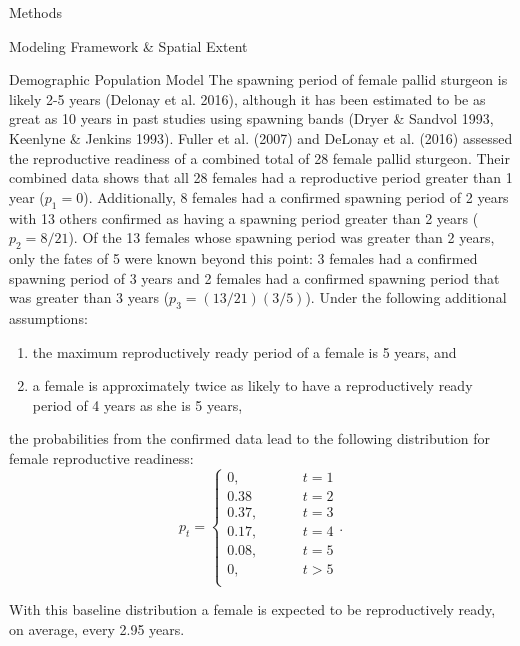 \documentclass[12pt]{article}
\begin{document}
\begin{section}{Methods}
\begin{subsection}{Modeling Framework \& Spatial Extent}
\begin{subsubsection}{Demographic Population Model}
The spawning period of female pallid sturgeon is likely 2-5 years (Delonay et al. 2016), although it has been estimated to be as great as 10 years in past studies using spawning bands (Dryer \& Sandvol 1993, Keenlyne \& Jenkins 1993).  Fuller et al. (2007) and DeLonay et al. (2016) assessed the reproductive readiness of a combined total of  28 female pallid sturgeon.  Their combined data shows that all 28 females had a reproductive period greater than 1 year ($p_1=0$).  Additionally, 8 females had a confirmed spawning period of 2 years with 13 others confirmed as having a spawning period greater than 2 years ($p_2=8/21$).  Of the 13 females whose spawning period was greater than 2 years, only the fates of 5 were known beyond this point: 3 females had a confirmed spawning period of 3 years and 2 females had a confirmed spawning period that was greater than 3 years ($p_3=(13/21)(3/5)$).  Under the following additional assumptions:
\begin{enumerate}
\item the maximum reproductively ready period of a female is 5 years, and
\item a female is approximately twice as likely to have a reproductively ready period of 4 years as she is 5 years,
\end{enumerate}
the probabilities from the confirmed data lead to the following distribution for female reproductive readiness:  
\begin{equation}
p_t = \begin{cases}
0, & \hspace{1cm} t=1\\
0.38 & \hspace{1cm} t=2\\
0.37, & \hspace{1cm} t=3\\
0.17, & \hspace{1cm} t=4\\
0.08, & \hspace{1cm} t=5\\
0, & \hspace{1cm} t>5\\
\end{cases}.
\label{pt}
\end{equation}

With this baseline distribution a female is expected to be reproductively ready, on average, every 2.95 years.\\  


\end{subsubsection}
\end{subsection}
\end{section}
\end{document}
